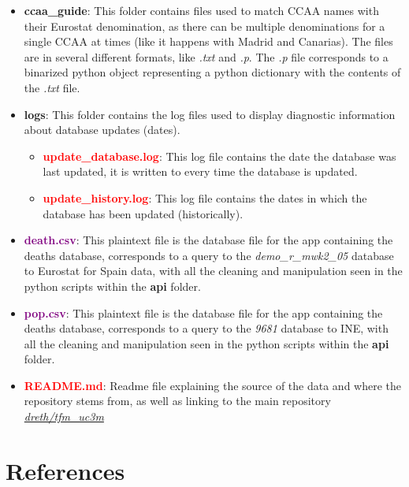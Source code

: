 \documentclass[
  a4paper]{article}
\providecommand{\tightlist}{%
  \setlength{\itemsep}{0pt}\setlength{\parskip}{0pt}}
\begin{document}
\begin{itemize}
\item
  \textcolor{darkspringgreen}{\textbf{ccaa\_guide}}: This folder
  contains files used to match CCAA names with their Eurostat
  denomination, as there can be multiple denominations for a single CCAA
  at times (like it happens with Madrid and Canarias). The files are in
  several different formats, like \emph{.txt} and \emph{.p}. The
  \emph{.p} file corresponds to a binarized python object representing a
  python dictionary with the contents of the \emph{.txt} file.
\item
  \textcolor{darkspringgreen}{\textbf{logs}}: This folder contains the
  log files used to display diagnostic information about database
  updates (dates).

  \begin{itemize}
  \tightlist
  \item
    \textcolor{red}{\textbf{update\_database.log}}: This log file
    contains the date the database was last updated, it is written to
    every time the database is updated.
  \item
    \textcolor{red}{\textbf{update\_history.log}}: This log file
    contains the dates in which the database has been updated
    (historically).
  \end{itemize}
\item
  \textcolor{purple}{\textbf{death.csv}}: This plaintext file is the
  database file for the app containing the deaths database, corresponds
  to a query to the \emph{demo\_r\_mwk2\_05} database to Eurostat for
  Spain data, with all the cleaning and manipulation seen in the python
  scripts within the \textcolor{darkspringgreen}{\textbf{api}} folder.
\item
  \textcolor{purple}{\textbf{pop.csv}}: This plaintext file is the
  database file for the app containing the deaths database, corresponds
  to a query to the \emph{9681} database to INE, with all the cleaning
  and manipulation seen in the python scripts within the
  \textcolor{darkspringgreen}{\textbf{api}} folder.
\item
  \textcolor{red}{\textbf{README.md}}: Readme file explaining the source
  of the data and where the repository stems from, as well as linking to
  the main repository
  \href{https://github.com/dreth/tfm_uc3m}{\emph{dreth/tfm\_uc3m}}
\end{itemize}

\newpage

\hypertarget{references}{%
\section{References}\label{references}}
\end{document}
